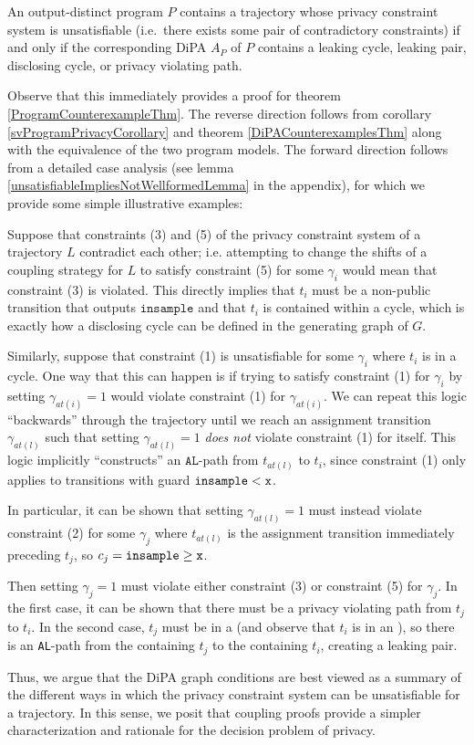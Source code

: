 \begin{thm}
    An output-distinct program $P$ contains a trajectory whose privacy constraint system is unsatisfiable (i.e.\ there exists some pair of contradictory constraints) if and only if the corresponding DiPA $A_P$ of $P$ contains a leaking cycle, leaking pair, disclosing cycle, or privacy violating path.
\end{thm}

Observe that this immediately provides a proof for theorem \ref{ProgramCounterexampleThm}. The reverse direction follows from corollary \ref{svProgramPrivacyCorollary} and theorem \ref{DiPACounterexamplesThm} along with the equivalence of the two program models.
The forward direction follows from a detailed case analysis (see lemma \ref{unsatisfiableImpliesNotWellformedLemma} in the appendix), for which we provide some simple illustrative examples:

Suppose that constraints (3) and (5) of the privacy constraint system of a trajectory $L$ contradict each other; i.e. attempting to change the shifts of a coupling strategy for $L$ to satisfy constraint (5) for some $\gamma_i$ would mean that constraint (3) is violated. This directly implies that $t_i$ must be a non-public transition that outputs $\texttt{insample}$ and that $t_i$ is contained within a cycle, which is exactly how a disclosing cycle can be defined in the generating graph of $G$. 

Similarly, suppose that constraint (1) is unsatisfiable for some $\gamma_i$ where $t_i$ is in a cycle. 
One way that this can happen is if trying to satisfy constraint (1) for $\gamma_i$ by setting $\gamma_{at(i)} = 1$ would violate constraint (1) for $\gamma_{at(i)}$. We can repeat this logic ``backwards'' through the trajectory until we reach an assignment transition $\gamma_{at(l)}$ such that setting $\gamma_{at(l)}=1$ \textit{does not} violate constraint (1) for itself. 
This logic implicitly ``constructs'' an $\texttt{AL}$-path from $t_{at(l)}$ to $t_i$, since constraint (1) only applies to transitions with guard $\lguard[\texttt{x}]$. 

In particular, it can be shown that setting $\gamma_{at(l)}=1$ must instead violate constraint (2) for some $\gamma_j$ where $t_{at(l)}$ is the assignment transition immediately preceding $t_j$, so $c_j = \gguard[\texttt{x}]$. 

Then setting $\gamma_{j}= 1$ must violate either constraint (3) or constraint (5) for $\gamma_{j}$. In the first case, it can be shown that there must be a privacy violating path from $t_j$ to $t_i$. In the second case, $t_{j}$ must be in a \gcycle (and observe that $t_i$ is in an \lcycle), so there is an \texttt{AL}-path from the \gcycle containing $t_j$ to the \lcycle containing $t_i$, creating a leaking pair. 

Thus, we argue that the DiPA graph conditions are best viewed as a summary of the different ways in which the privacy constraint system can be unsatisfiable for a trajectory. In this sense, we posit that coupling proofs provide a simpler characterization and rationale for the decision problem of privacy. 
